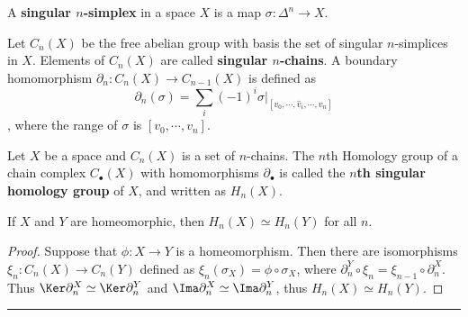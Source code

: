\begin{defn} A \textbf{singular $n$-simplex} in a space $X$ is a map $\sigma:\Delta^n\rightarrow X$.
\end{defn}
\begin{defn} Let $C_n(X)$ be the free abelian group with basis the set of singular $n$-simplices in $X$. Elements of $C_n(X)$ are called \textbf{singular $n$-chains}. A boundary homomorphism $\partial_n:C_n(X)\rightarrow C_{n-1}(X)$ is defined as
\begin{equation}
\partial_n (\sigma)=\sum_i (-1)^i\sigma |_{[v_0,\cdots,\hat{v}_i,\cdots,v_n]}
\end{equation}, where the range of $\sigma$ is $[v_0,\cdots,v_n]$.
\end{defn}
\begin{defn} Let $X$ be a space and $C_n(X)$ is a set of $n$-chains. The $n$th Homology group of a chain complex $C_\bullet(X)$ with homomorphisms $\partial_\bullet$ is called the \textbf{$n$th singular homology group} of $X$, and written as $H_n(X)$.
\end{defn}
\begin{prop} If $X$ and $Y$ are homeomorphic, then $H_n(X)\simeq H_n(Y)$ for all $n$.
\end{prop}
\begin{proof} Suppose that $\phi:X\rightarrow Y$ is a homeomorphism. Then there are isomorphisms $\xi_n:C_n(X)\rightarrow C_n(Y)$ defined as $\xi_n(\sigma_X)=\phi\circ \sigma_X$, where $\partial_n^Y\circ \xi_n=\xi_{n-1}\circ \partial_n^X$. Thus $\Ker \partial_n^X\simeq \Ker \partial_n^Y$ and $\Ima \partial_n^X\simeq \Ima\partial_n^Y$, thus $H_n(X)\simeq H_n(Y)$.
\end{proof}
\noindent\rule{\textwidth}{1pt}
\newline